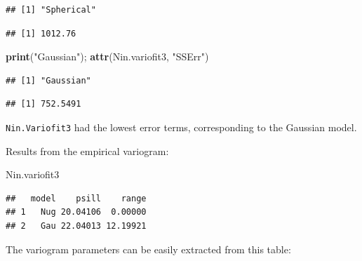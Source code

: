 \documentclass[]{book}
\newenvironment{Shaded}{\begin{snugshade}}{\end{snugshade}}
\newcommand{\CommentTok}[1]{\textcolor[rgb]{0.56,0.35,0.01}{\textit{#1}}}
\newcommand{\DecValTok}[1]{\textcolor[rgb]{0.00,0.00,0.81}{#1}}
\newcommand{\KeywordTok}[1]{\textcolor[rgb]{0.13,0.29,0.53}{\textbf{#1}}}
\newcommand{\NormalTok}[1]{#1}
\newcommand{\OperatorTok}[1]{\textcolor[rgb]{0.81,0.36,0.00}{\textbf{#1}}}
\newcommand{\StringTok}[1]{\textcolor[rgb]{0.31,0.60,0.02}{#1}}
\begin{document}
\begin{verbatim}
## [1] "Spherical"
\end{verbatim}

\begin{verbatim}
## [1] 1012.76
\end{verbatim}

\begin{Shaded}
\begin{Highlighting}[]
\KeywordTok{print}\NormalTok{(}\StringTok{"Gaussian"}\NormalTok{); }\KeywordTok{attr}\NormalTok{(Nin.variofit3, }\StringTok{"SSErr"}\NormalTok{)}
\end{Highlighting}
\end{Shaded}

\begin{verbatim}
## [1] "Gaussian"
\end{verbatim}

\begin{verbatim}
## [1] 752.5491
\end{verbatim}

\texttt{Nin.Variofit3} had the lowest error terms, corresponding to the Gaussian model.

Results from the empirical variogram:

\begin{Shaded}
\begin{Highlighting}[]
\NormalTok{Nin.variofit3}
\end{Highlighting}
\end{Shaded}

\begin{verbatim}
##   model    psill    range
## 1   Nug 20.04106  0.00000
## 2   Gau 22.04013 12.19921
\end{verbatim}

The variogram parameters can be easily extracted from this table:

\begin{Shaded}
\end{Shaded}
\end{document}
